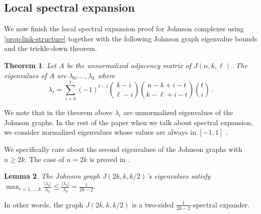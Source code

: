 \documentclass[10pt,a4paper]{article}
\newcommand{\prettyref}[1]{\cref{#1}}
\newtheorem{theorem}{Theorem}[section]
\newtheorem{lemma}[theorem]{Lemma}
\newtheorem{corollary}[theorem]{Corollary}
\theoremstyle{definition}
\theoremstyle{remark}
\newcommand{\abs}[1]{\lvert#1\rvert}
\renewcommand{\le}{\leqslant}
\renewcommand{\ge}{\geqslant}
\numberwithin{equation}{section}
\let\pref=\prettyref
\begin{document}




\subsection{Local spectral expansion}
We now finish the local spectral expansion proof for Johnson complexes using \pref{prop:link-structure} together with the following Johnson graph eigenvalue bounds and the trickle-down theorem.

\begin{theorem}{\cite{DelsarteL1998}}
\label{thm:Johnson-graph-eigenvalue}
Let $A$ be the unnormalized adjacency matrix of \(J(n,k,\ell)\). The eigenvalues of $A$ are $\lambda_0,\dots,\lambda_k$ where 
\[\lambda_t = \sum_{i=0}^t (-1)^{t-i} \binom{k-i}{\ell-i} \binom{n-k+i-t}{k-\ell+i-t}\binom{t}{i} \,. \]
\end{theorem}
We note that in the theorem above $\lambda_i$ are unnormalized eigenvalues of the Johnson graphs. In the rest of the paper when we talk about spectral expansion, we consider normalized eigenvalues whose values are always in $[-1,1]$ . 

We specifically care about the second eigenvalues of the Johnson graphs with $n \ge 2k$. The case of $n = 2k$ is proved in \cite{Koshelev2023}.
\begin{lemma}{\cite{Koshelev2023}}\label{lem:Johnson-eigval-2k}
    The Johnson graph $J(2k,k,k/2)$'s eigenvalues satisfy $\max_{t=1,\dots,k} \frac{\abs{\lambda_t}}{\lambda_0}\le \frac{\abs{\lambda_2}}{\lambda_0} = \frac{1}{2k-2}$. 
\end{lemma}
In other words, the graph $J(2k,k,k/2)$ is a two-sided $\frac{1}{2k-2}$-spectral expander. 
\end{document}
